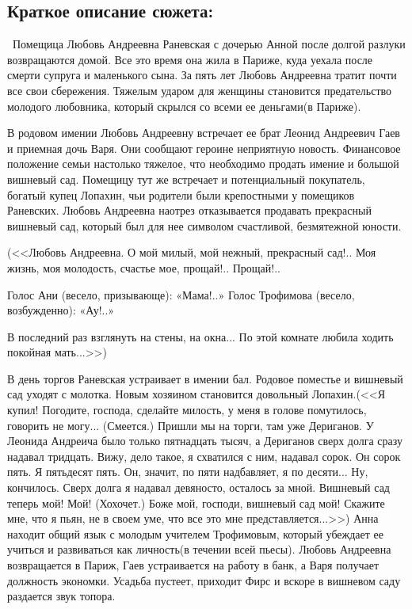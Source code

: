 \documentclass[a4paper,12pt]{article}
\begin{document}
	\subsection{Краткое описание сюжета: }
	\quad \, Помещица Любовь Андреевна Раневская с дочерью Анной после долгой разлуки возвращаются домой. Все это время она жила в Париже, куда уехала после смерти супруга и маленького сына. За пять лет Любовь Андреевна тратит почти все свои сбережения. Тяжелым ударом для женщины становится предательство молодого любовника, который скрылся со всеми ее деньгами(в Париже).
	
	В родовом имении Любовь Андреевну встречает ее брат Леонид Андреевич Гаев и приемная дочь Варя. Они сообщают героине неприятную новость. Финансовое положение семьи настолько тяжелое, что необходимо продать имение и большой вишневый сад. Помещицу тут же встречает и потенциальный покупатель, богатый купец Лопахин, чьи родители были крепостными у помещиков Раневских. Любовь Андреевна наотрез отказывается продавать прекрасный вишневый сад, который был для нее символом счастливой, безмятежной юности.
	
	\noindent
	(<<Любовь Андреевна. О мой милый, мой нежный, прекрасный сад!.. Моя жизнь, моя молодость, счастье мое, прощай!.. Прощай!..
	
	Голос Ани (весело, призывающе): «Мама!..» Голос Трофимова (весело, возбужденно): «Ау!..»
	
	\noindent
	В последний раз взглянуть на стены, на окна... По этой комнате любила ходить покойная мать...>>)
	
	В день торгов Раневская устраивает в имении бал. Родовое поместье и вишневый сад уходят с молотка. Новым хозяином становится довольный Лопахин.(<<Я купил! Погодите, господа, сделайте милость, у меня в голове помутилось, говорить не могу... (Смеется.) Пришли мы на торги, там уже Дериганов. У Леонида Андреича было только пятнадцать тысяч, а Дериганов сверх долга сразу надавал тридцать. Вижу, дело такое, я схватился с ним, надавал сорок. Он сорок пять. Я пятьдесят пять. Он, значит, по пяти надбавляет, я по десяти... Ну, кончилось. Сверх долга я надавал девяносто, осталось за мной. Вишневый сад теперь мой! Мой! (Хохочет.) Боже мой, господи, вишневый сад мой! Скажите мне, что я пьян, не в своем уме, что все это мне представляется...>>) Анна находит общий язык с молодым учителем Трофимовым, который убеждает ее учиться и развиваться как личность(в течении всей пьесы). Любовь Андреевна возвращается в Париж, Гаев устраивается на работу в банк, а Варя получает должность экономки. Усадьба пустеет, приходит Фирс и вскоре в вишневом саду раздается звук топора.
	
\end{document}
